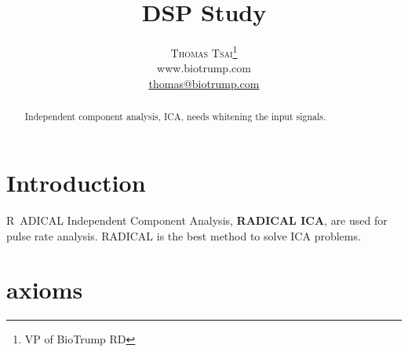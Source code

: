 \documentclass[a4paper,12pt]{article}
\title{\vspace{-15mm}\fontsize{24pt}{10pt}\selectfont\textbf{DSP Study}} %
\author{
\large
\textsc{Thomas Tsai}\thanks{VP of BioTrump RD}\\[2mm] %
\normalsize www.biotrump.com \\ %
\normalsize \href{mailto:thomas@biotrump.com}{thomas@biotrump.com} %
\vspace{-5mm}
}
\date{}
\begin{document}
\maketitle %

\thispagestyle{fancy} %


\begin{abstract}

Independent component analysis, ICA, needs whitening the input signals.

\end{abstract}



\section{Introduction}

\lettrine[nindent=0em,lines=3]{R}\ ADICAL Independent Component Analysis, \textbf{RADICAL ICA},
\cite{radical-ica} \cite{journals/informaticaSI/NaikK11} are used for pulse rate analysis.
RADICAL is the best method to solve ICA problems.


\section{axioms}
\end{document}
